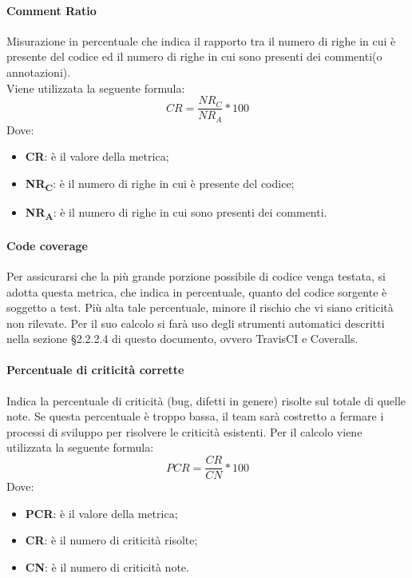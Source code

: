 \paragraph{Comment Ratio}\Spazio
Misurazione in percentuale che indica il rapporto tra il numero di righe in cui è presente del codice ed il numero di righe in cui sono presenti dei commenti(o annotazioni). \\
Viene utilizzata la seguente formula:
$$CR=\frac{NR_C}{NR_A}*100$$
Dove:
\begin{itemize}
	\item{\textbf{CR}: è il valore della metrica;}
	\item{\textbf{NR\textsubscript{C}}: è il numero di righe in cui è presente del codice;}
	\item{\textbf{NR\textsubscript{A}}: è il numero di righe in cui sono presenti dei commenti.}
\end{itemize}

\paragraph{Code coverage}\Spazio
Per assicurarsi che la più grande porzione possibile di codice venga testata, si adotta questa metrica, che indica in percentuale, quanto del codice sorgente
è soggetto a test. Più alta tale percentuale, minore il rischio che vi siano criticità non rilevate.
Per il suo calcolo si farà uso degli strumenti automatici descritti nella sezione §2.2.2.4 di questo documento, ovvero TravisCI e Coveralls.

\paragraph{Percentuale di criticità corrette} \Spazio
Indica la percentuale di criticità (bug, difetti in genere) risolte sul totale di quelle note.
Se questa percentuale è troppo bassa, il team sarà costretto a fermare i processi di sviluppo per risolvere le criticità esistenti.
Per il calcolo viene utilizzata la seguente formula:
$$PCR=\frac{CR}{CN}*100$$
Dove:
\begin{itemize}
	\item{\textbf{PCR}: è il valore della metrica;}
	\item{\textbf{CR}: è il numero di criticità risolte;}
	\item{\textbf{CN}: è il numero di criticità note.}
\end{itemize}

